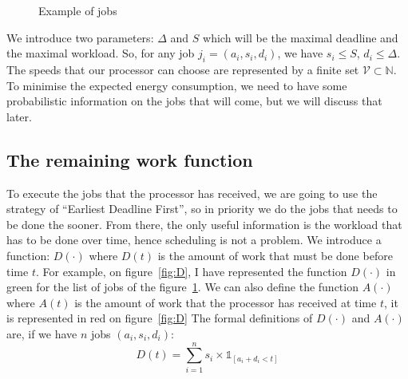 \documentclass[
10pt, %
a4paper, %
oneside, %
headinclude,footinclude, %
BCOR5mm, %
]{scrartcl}
\newcommand{\N}{\mathbb{N}}
\newcommand{\V}{\mathcal{V}}
\begin{document}
\begin{figure}
  \centering
  \caption{Example of jobs}
  \label{fig:jobs}  
\end{figure}

We introduce two parameters: $\Delta$ and $S$ which will be the maximal
deadline and the maximal workload. So, for any job
$j_i=(a_i,s_i,d_i)$, we have $s_i\leq S$, $d_i\leq \Delta$.
The speeds that our processor can choose are represented by a finite
set $\V\subset\N$. To minimise the expected energy consumption, we
need to have some probabilistic information on the jobs that will
come, but we will discuss that later.

\subsection{The remaining work function}
To execute the jobs that the processor has
received, we are going to use the strategy of ``Earliest Deadline
First'', so in priority we do the jobs that needs to be done the
sooner. From there, the only useful information is the workload that
has to be done over time, hence scheduling is not a problem. 
We introduce a function: $D(\cdot)$ where $D(t)$ is the amount of
work that must be done before time $t$. For example, on
figure~\ref{fig:D}, I have represented the function $D(\cdot)$ in
green for the list of jobs of the figure~\ref{fig:jobs}. We can also
define the function $A(\cdot)$ where $A(t)$ is the amount of work that
the processor has received at time $t$, it is represented in red on
figure~\ref{fig:D} The formal definitions of $D(\cdot)$ and $A(\cdot)$
are, if we have $n$ jobs $(a_i,s_i,d_i)$:
\begin{equation}
  \label{eq:D}
  D(t) = \sum_{i=1}^ns_i\times\mathbb{1}_{[a_i+d_i<t]}
\end{equation}
\end{document}
